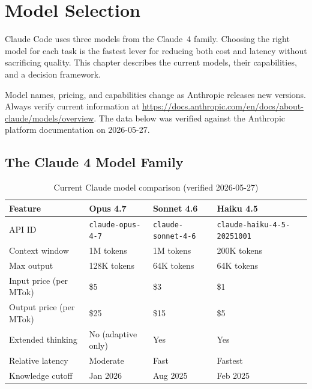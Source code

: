 \chapter{Model Selection}
\label{ch:models}


Claude Code uses three models from the Claude~4 family. Choosing the right
model for each task is the fastest lever for reducing both cost and latency
without sacrificing quality. This chapter describes the current models, their
capabilities, and a decision framework.

\begin{warningbox}
Model names, pricing, and capabilities change as Anthropic releases new
versions. Always verify current information at
\url{https://docs.anthropic.com/en/docs/about-claude/models/overview}.
The data below was verified against the Anthropic platform documentation
on 2026-05-27.
\end{warningbox}

\section{The Claude 4 Model Family}
\label{sec:model-family}


\begin{table}[ht]
\centering
\caption{Current Claude model comparison (verified 2026-05-27)}
\label{tab:model-comparison}
\begin{tabularx}{\textwidth}{lllll}
\toprule
\textbf{Feature}        & \textbf{Opus 4.7}     & \textbf{Sonnet 4.6}   & \textbf{Haiku 4.5} \\
\midrule
API ID                  & \texttt{claude-opus-4-7}
                        & \texttt{claude-sonnet-4-6}
                        & \texttt{claude-haiku-4-5-20251001} \\
Context window          & 1M tokens             & 1M tokens             & 200K tokens \\
Max output              & 128K tokens           & 64K tokens            & 64K tokens \\
Input price (per MTok)  & \$5                   & \$3                   & \$1 \\
Output price (per MTok) & \$25                  & \$15                  & \$5 \\
Extended thinking       & No (adaptive only)    & Yes                   & Yes \\
Relative latency        & Moderate              & Fast                  & Fastest \\
Knowledge cutoff        & Jan 2026              & Aug 2025              & Feb 2025 \\
\bottomrule
\end{tabularx}
\end{table}

